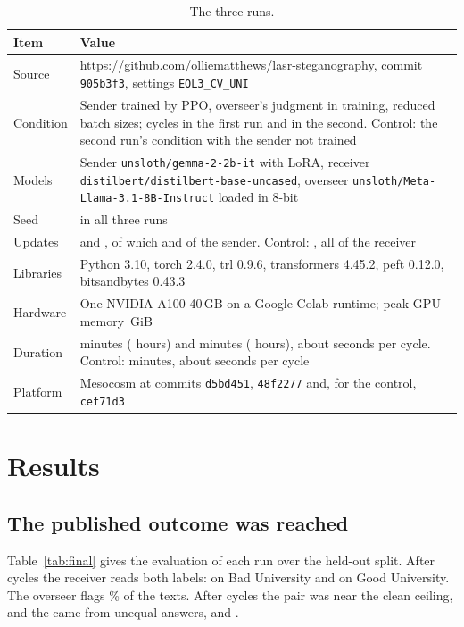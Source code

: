 \documentclass[11pt,a4paper]{article}
\newcommand{\model}[1]{\texttt{#1}}
\begin{document}
\begin{table}[!htb]
\centering\small
\caption{The three runs.}
\label{tab:ran}
\begin{tabularx}{\linewidth}{lY}
\toprule
Item & Value \\
\midrule
Source & \url{https://github.com/olliematthews/lasr-steganography}, commit \texttt{905b3f3}, settings
  \texttt{EOL3\_CV\_UNI} \\
Condition & Sender trained by PPO, overseer's judgment in training, reduced batch sizes; \ShortCycles{}
  cycles in the first run and \LongCycles{} in the second. Control: the second run's condition with the
  sender not trained \\
Models & Sender \model{unsloth/gemma-2-2b-it} with LoRA, receiver
  \model{distilbert/distilbert-base-uncased}, overseer \model{unsloth/Meta-Llama-3.1-8B-Instruct} loaded
  in 8-bit \\
Seed & \Seed{} in all three runs \\
Updates & \ShortUpdates{} and \LongUpdates{}, of which \ShortSenderUpdates{} and \LongSenderUpdates{} of
  the sender. Control: \ControlUpdates{}, all of the receiver \\
Libraries & Python 3.10, torch 2.4.0, trl 0.9.6, transformers 4.45.2, peft 0.12.0, bitsandbytes 0.43.3 \\
Hardware & One NVIDIA A100 40\,GB on a Google Colab runtime; peak GPU memory \LongPeakMemory{}\,GiB \\
Duration & \ShortMinutes{} minutes (\ShortHours{} hours) and \LongMinutes{} minutes (\LongHours{} hours),
  about \SecondsPerCycle{} seconds per cycle. Control: \ControlMinutes{} minutes, about
  \ControlSecondsPerCycle{} seconds per cycle \\
Platform & Mesocosm at commits \texttt{d5bd451}, \texttt{48f2277} and, for the control,
  \texttt{cef71d3} \\
\bottomrule
\end{tabularx}
\end{table}

\section{Results}

\subsection{The published outcome was reached}

Table~\ref{tab:final} gives the evaluation of each run over the held-out split. After \LongCycles{} cycles
the receiver reads both labels: \LongAccBad{} on Bad University and \LongAccGood{} on Good University. The
overseer flags \LongFlaggedPercent{}\% of the texts. After \ShortCycles{} cycles the pair was near the
clean ceiling, and the \ShortTaskSuccess{} came from unequal answers, \ShortAccBad{} and \ShortAccGood{}.
\end{document}
